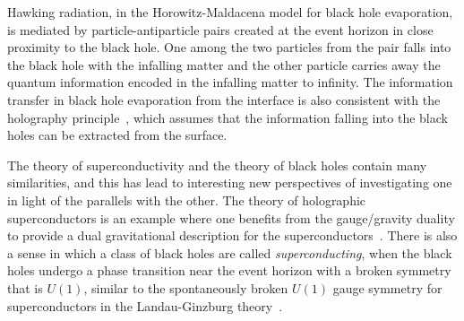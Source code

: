 \documentclass[10pt,letterpaper,aps,onecolumn,superscriptaddress,floatfix,notitlepage]{revtex4-1}
\begin{document}
	Hawking radiation, in the Horowitz-Maldacena model for black hole evaporation, is mediated by particle-antiparticle pairs created at the event horizon in close proximity to the black hole. One among the two particles from the pair falls into the black hole with the infalling matter and the other particle carries away the quantum information encoded in the infalling matter to infinity. The information transfer in black hole evaporation from the interface is also consistent with the holography principle~\cite{hologram}, which assumes that the information falling into the black holes can be extracted from the surface.  
	
	The theory of superconductivity and the theory of black holes contain many similarities, and this has lead to interesting new perspectives of investigating one in light of the parallels with the other. The theory of holographic superconductors is an example where one benefits from the gauge/gravity duality to provide a dual gravitational description for the superconductors~\cite{holo2,gaugegravity,holosc}. There is also a sense in which a class of black holes are called \textit{superconducting}, when the black holes undergo a phase transition near the event horizon with a broken symmetry that is $U(1)$, similar to the spontaneously broken $U(1)$ gauge symmetry for superconductors in the Landau-Ginzburg theory~\cite{london,scbh,scbh2}. 
	
\end{document}

